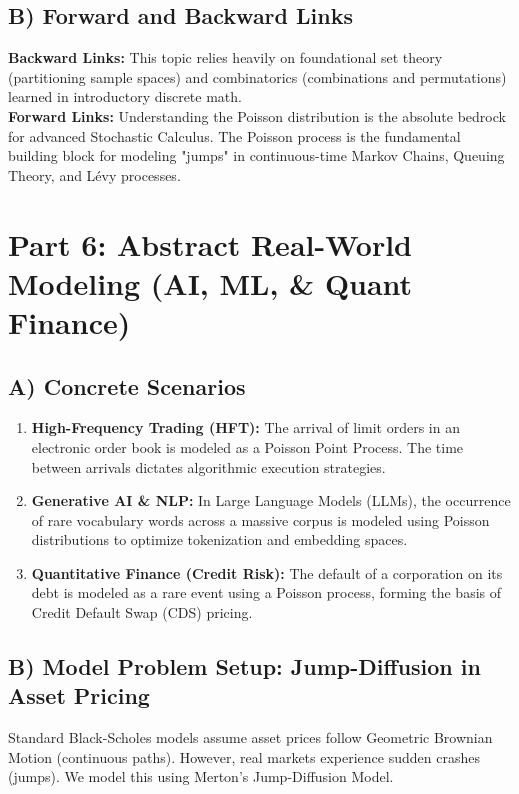 \documentclass[11pt]{article}
\theoremstyle{definition}
\theoremstyle{remark}
\begin{document}
\subsection{B) Forward and Backward Links}
\textbf{Backward Links:} This topic relies heavily on foundational set theory (partitioning sample spaces) and combinatorics (combinations and permutations) learned in introductory discrete math. \\
\textbf{Forward Links:} Understanding the Poisson distribution is the absolute bedrock for advanced Stochastic Calculus. The Poisson process is the fundamental building block for modeling "jumps" in continuous-time Markov Chains, Queuing Theory, and L\'{e}vy processes.

\section{Part 6: Abstract Real-World Modeling (AI, ML, \& Quant Finance)}

\subsection{A) Concrete Scenarios}
\begin{enumerate}
    \item \textbf{High-Frequency Trading (HFT):} The arrival of limit orders in an electronic order book is modeled as a Poisson Point Process. The time between arrivals dictates algorithmic execution strategies.
    \item \textbf{Generative AI \& NLP:} In Large Language Models (LLMs), the occurrence of rare vocabulary words across a massive corpus is modeled using Poisson distributions to optimize tokenization and embedding spaces.
    \item \textbf{Quantitative Finance (Credit Risk):} The default of a corporation on its debt is modeled as a rare event using a Poisson process, forming the basis of Credit Default Swap (CDS) pricing.
\end{enumerate}

\subsection{B) Model Problem Setup: Jump-Diffusion in Asset Pricing}
Standard Black-Scholes models assume asset prices follow Geometric Brownian Motion (continuous paths). However, real markets experience sudden crashes (jumps). We model this using Merton's Jump-Diffusion Model.
\end{document}
